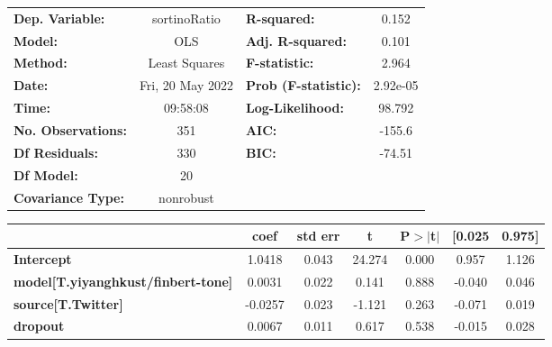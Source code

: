 \begin{center}
\begin{tabular}{lclc}
\toprule
\textbf{Dep. Variable:}                    &   sortinoRatio   & \textbf{  R-squared:         } &     0.152   \\
\textbf{Model:}                            &       OLS        & \textbf{  Adj. R-squared:    } &     0.101   \\
\textbf{Method:}                           &  Least Squares   & \textbf{  F-statistic:       } &     2.964   \\
\textbf{Date:}                             & Fri, 20 May 2022 & \textbf{  Prob (F-statistic):} &  2.92e-05   \\
\textbf{Time:}                             &     09:58:08     & \textbf{  Log-Likelihood:    } &    98.792   \\
\textbf{No. Observations:}                 &         351      & \textbf{  AIC:               } &    -155.6   \\
\textbf{Df Residuals:}                     &         330      & \textbf{  BIC:               } &    -74.51   \\
\textbf{Df Model:}                         &          20      & \textbf{                     } &             \\
\textbf{Covariance Type:}                  &    nonrobust     & \textbf{                     } &             \\
\bottomrule
\end{tabular}
\begin{tabular}{lcccccc}
                                           & \textbf{coef} & \textbf{std err} & \textbf{t} & \textbf{P$> |$t$|$} & \textbf{[0.025} & \textbf{0.975]}  \\
\midrule
\textbf{Intercept}                         &       1.0418  &        0.043     &    24.274  &         0.000        &        0.957    &        1.126     \\
\textbf{model[T.yiyanghkust/finbert-tone]} &       0.0031  &        0.022     &     0.141  &         0.888        &       -0.040    &        0.046     \\
\textbf{source[T.Twitter]}                 &      -0.0257  &        0.023     &    -1.121  &         0.263        &       -0.071    &        0.019     \\
\textbf{dropout}                           &       0.0067  &        0.011     &     0.617  &         0.538        &       -0.015    &        0.028     \\

\end{tabular}
\end{center}
